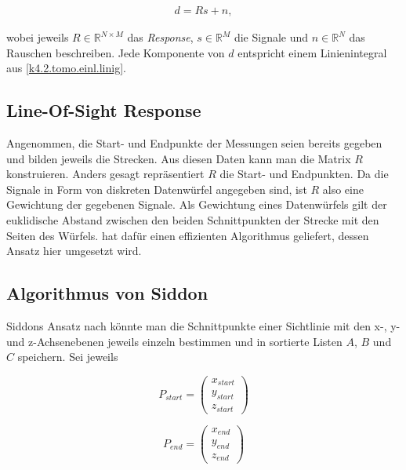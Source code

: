 \begin{equation}
  \begin{aligned}
    d = Rs + n,
  \end{aligned}
\end{equation}

wobei jeweils $R \in \mathbb{R}^{N \times M}$ das \emph{Response}, $s \in \mathbb{R}^M$ die Signale und $n \in \mathbb{R}^N$ das Rauschen beschreiben. Jede Komponente von $d$ entspricht einem Linienintegral aus \cref{k4.2.tomo.einl.linig}.

\subsection{Line-Of-Sight Response}

Angenommen, die Start- und Endpunkte der Messungen seien bereits gegeben und bilden jeweils die Strecken. Aus diesen Daten kann man die Matrix $R$ konstruieren. Anders gesagt repräsentiert $R$ die Start- und Endpunkten. Da die Signale in Form von diskreten Datenwürfel angegeben sind, ist $R$ also eine Gewichtung der gegebenen Signale. Als Gewichtung eines Datenwürfels gilt der euklidische Abstand zwischen den beiden Schnittpunkten der Strecke mit den Seiten des Würfels. \textcite{k4.2.siddon} hat dafür einen effizienten Algorithmus geliefert, dessen Ansatz hier umgesetzt wird.


\subsection{Algorithmus von Siddon}\label{k4.2.ct.siddon}

Siddons Ansatz nach könnte man die Schnittpunkte einer Sichtlinie mit den x-, y- und z-Achsenebenen jeweils einzeln bestimmen und in sortierte Listen $A$, $B$ und $C$ speichern. Sei jeweils

\begin{equation}
  P_{start} = \begin{pmatrix}x_{start} \\ y_{start} \\ z_{start}\end{pmatrix}
\end{equation}

\begin{equation}
  P_{end} = \begin{pmatrix}x_{end} \\ y_{end} \\ z_{end}\end{pmatrix}
\end{equation}

